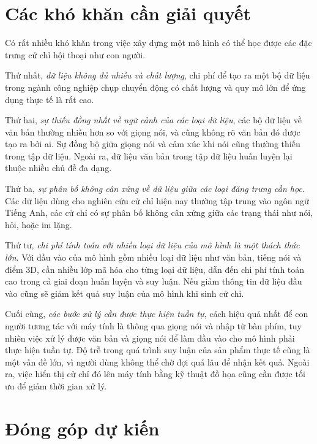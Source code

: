 \section{Các khó khăn cần giải quyết}

Có rất nhiều khó khăn trong việc xây dựng một mô hình có thể học được các đặc trưng cử chỉ hội thoại như con người.

Thứ nhất, \textit{dữ liệu không đủ nhiều và chất lượng}, chi phí để tạo ra một bộ dữ liệu trong ngành công nghiệp chụp chuyển động có chất lượng và quy mô lớn để ứng dụng thực tế là rất cao.

Thứ hai, \textit{sự thiếu đồng nhất về ngữ cảnh của các loại dữ liệu}, các bộ dữ liệu về văn bản thường nhiều hơn so với giọng nói, và cũng không rõ văn bản đó được tạo ra bởi ai. Sự đồng bộ giữa giọng nói và cảm xúc khi nói cũng thường thiếu trong tập dữ liệu. Ngoài ra, dữ liệu văn bản trong tập dữ liệu huấn luyện lại thuộc nhiều chủ đề đa dạng.
 
Thứ ba, \textit{sự phân bố không cân xứng về  dữ liệu giữa các loại đăng trưng cần học}. Các dữ liệu dùng cho nghiên cứu cử chỉ hiện nay thường tập trung vào ngôn ngữ Tiếng Anh, các cử chỉ có sự phân bố không cân xứng giữa các trạng thái như nói, hỏi, hoặc im lặng.

Thứ tư, \textit{chi phí tính toán với nhiều loại dữ liệu của mô hình là một thách thức lớn}. Với đầu vào của mô hình gồm nhiều loại dữ liệu như văn bản, tiếng nói và điểm 3D, cần nhiều lớp mã hóa cho từng loại dữ liệu, dẫn đến chi phí tính toán cao trong cả giai đoạn huấn luyện và suy luận. Nếu giảm thông tin dữ liệu đầu vào cũng sẽ giảm kết quả suy luận của mô hình khi sinh cử chỉ.

Cuối cùng, \textit{các bước xử lý cần được thực hiện tuần tự}, cách hiệu quả nhất để con người tương tác với máy tính là thông qua giọng nói và nhập từ bàn phím, tuy nhiên việc xử lý được văn bản và giọng nói để làm đầu vào cho mô hình phải thực hiện tuần tự. Độ trễ trong quá trình suy luận của sản phẩm thực tế cũng là một vấn đề lớn, vì người dùng không thể chờ đợi quá lâu để nhận kết quả. Ngoài ra, việc hiển thị cử chỉ đó lên máy tính bằng kỹ thuật đồ họa cũng cần được tối ưu để giảm thời gian xử lý.


\section{Đóng góp dự kiến}


